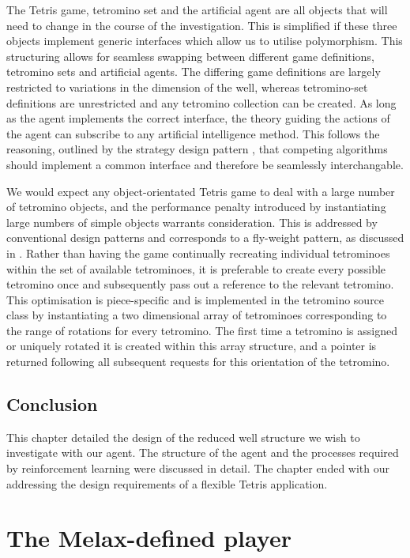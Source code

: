 \documentclass{rucsthesis}
\begin{document}
The Tetris game, tetromino set and the artificial agent are all objects that will need to change in the course of the investigation. This is simplified if these three objects implement generic interfaces which allow us to utilise polymorphism. This structuring allows for seamless swapping between different game definitions, tetromino sets and artificial agents. The differing game definitions are largely restricted to variations in the dimension of the well, whereas tetromino-set definitions are unrestricted and any tetromino collection can be created. As long as the agent implements the correct interface, the theory guiding the actions of the agent can subscribe to any artificial intelligence method. This follows the reasoning, outlined by the strategy design pattern \citep{designp}, that competing algorithms should implement a common interface and therefore be seamlessly interchangable.

We would expect any object-orientated Tetris game to deal with a large number of tetromino objects, and the performance penalty introduced by instantiating large numbers of simple objects warrants consideration. This is addressed by conventional design patterns and corresponds to a fly-weight pattern, as discussed in \cite{designp}. Rather than having the game continually recreating individual tetrominoes within the set of available tetrominoes, it is preferable to create every possible tetromino once and subsequently pass out a reference to the relevant tetromino. This optimisation is piece-specific and is implemented in the tetromino source class by instantiating a two dimensional array of tetrominoes corresponding to the range of rotations for every tetromino. The first time a tetromino is assigned or uniquely rotated it is created within this array structure, and a pointer is returned following all subsequent requests for this orientation of the tetromino.

\section{Conclusion}

This chapter detailed the design of the reduced well structure we wish to investigate with our agent. The structure of the agent and the processes required by reinforcement learning were discussed in detail. The chapter ended with our addressing the design requirements of a flexible Tetris application. 

\chapter{The Melax-defined player}
\end{document}

